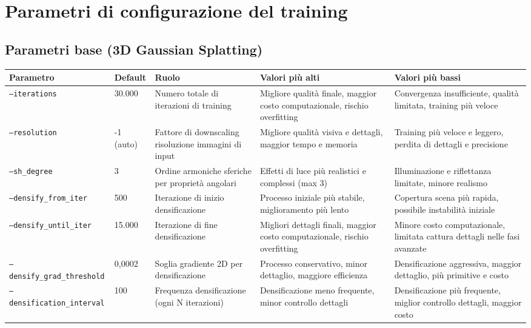 \chapter{Parametri di configurazione del training}\label{app:parametri}

\section{Parametri base (3D Gaussian Splatting)}\label{app:3dgs}
\begin{sidewaystable}
	\centering
	\footnotesize
	\begin{tabular}{|p{3.9cm}|p{1.3cm}|p{3.8cm}|p{3.8cm}|p{3.8cm}|}
		\hline
		\textbf{Parametro} & \textbf{Default} & \textbf{Ruolo} & \textbf{Valori più alti} & \textbf{Valori più bassi} \\ 
		\hline
		\texttt{--iterations} & 30.000 & Numero totale di iterazioni di training & Migliore qualità finale, maggior costo computazionale, rischio overfitting & Convergenza insufficiente, qualità limitata, training più veloce \\
		\hline
		\texttt{--resolution} & -1 (auto) & Fattore di downscaling risoluzione immagini di input & Migliore qualità visiva e dettagli, maggior tempo e memoria & Training più veloce e leggero, perdita di dettagli e precisione\\
		\hline
		\texttt{--sh\_degree} & 3 & Ordine armoniche sferiche per proprietà angolari & Effetti di luce più realistici e complessi (max 3) & Illuminazione e riflettanza limitate, minore realismo \\
		\hline
		\texttt{--densify\_from\_iter} & 500 & Iterazione di inizio densificazione & Processo iniziale più stabile, miglioramento più lento & Copertura scena più rapida, possibile instabilità iniziale \\
		\hline
		\texttt{--densify\_until\_iter} & 15.000 & Iterazione di fine densificazione & Migliori dettagli finali, maggior costo computazionale, rischio overfitting & Minore costo computazionale, limitata cattura dettagli nelle fasi avanzate\\
		\hline
		\texttt{--densify\_grad\_threshold} & 0,0002 & Soglia gradiente 2D per densificazione & Processo conservativo, minor dettaglio, maggiore efficienza & Densificazione aggressiva, maggior dettaglio, più primitive e costo \\
		\hline
		\texttt{--densification\_interval} & 100 & Frequenza densificazione (ogni N iterazioni) & Densificazione meno frequente, minor controllo dettagli & Densificazione più frequente, miglior controllo dettagli, maggior costo\\

\end{tabular}
\end{sidewaystable}

